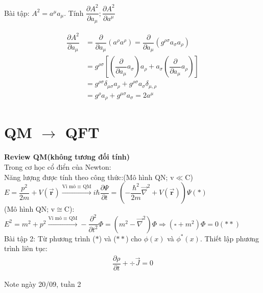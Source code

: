 \documentclass{report}
\begin{document}
\clearpage

Bài tập: $A^2 = a^\mu a_\mu $. Tính $\dfrac{\partial A^2}{\partial a_\mu}; \dfrac{\partial A^2}{\partial a^\mu}$

\begin{align*}
	\dfrac{\partial A^2}{\partial a_\mu} & = \dfrac{\partial}{\partial a_\mu}(a^\rho a^\rho) = \dfrac{\partial}{\partial a_\mu}(g^{\rho \sigma}a_\sigma a_\rho)                                        \\
	                                     & = g^{\rho \sigma} \left[ \left(\dfrac{\partial}{\partial a_\mu}a_\sigma\right)a_\rho + a_\sigma \left(\dfrac{\partial}{\partial a_\mu}a_\rho\right) \right] \\
	                                     & = g^{\rho \sigma}\delta_{\mu\sigma}a_{\rho} + g^{\rho\sigma}a_{\sigma}\delta_{\mu,\rho}                                                                     \\
	                                     & = g^{\rho}a_{\rho} + g^{\mu\sigma}a_{\sigma} = 2 a^{\mu}
\end{align*}
\section*{QM $\rightarrow$ QFT}
\noindent\textbf{Review QM(không tương đối tính)}\\
Trong cơ học cổ điển của Newton:\\
Năng lượng được tính theo công thức:(Mô hình QN; v$\ll$C)\\
$E = \dfrac{p^2}{2m} + V(\vec{\mathbf{r}}) \overset{\text{Vi mô $\equiv$ QM}}{\longrightarrow} i\hbar\dfrac{\partial\Psi}{\partial t} = (-\dfrac{\hbar^2}{2m}\vec{\nabla}^2 +  V(\vec{\mathbf{r}}))\Psi (\ast) $ \\
(Mô hình QN; v$\cong$C):\\
$E^2 = m^2 + p^2 \overset{\text{Vi mô $\equiv$ QM}}{\longrightarrow} -\dfrac{\partial^2}{\partial t^2}\Phi = (m^2 - \vec{\nabla}^2)\Phi \Rightarrow (\square + m^2)\Phi = 0 (\ast\ast) $ \\

Bài tập 2: Từ phương trình ($\ast$) và ($\ast\ast$) cho $\phi(x)$ và $\phi^\ast (x)$. Thiết lập phương trình liên tục:
\begin{align*}
	\dfrac{\partial \rho}{\partial t} + \div\vec{J} = 0
\end{align*}
\newpage

Note ngày 20/09, tuần 2
\end{document}

